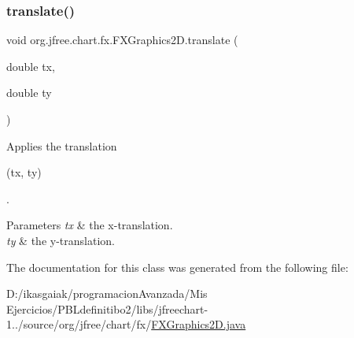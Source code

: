 \subsubsection{\texorpdfstring{translate()}{translate()}\hspace{0.1cm}{\footnotesize\ttfamily [2/2]}}
{\footnotesize\ttfamily void org.\+jfree.\+chart.\+fx.\+F\+X\+Graphics2\+D.\+translate (\begin{DoxyParamCaption}\item[{double}]{tx,  }\item[{double}]{ty }\end{DoxyParamCaption})}

Applies the translation
\begin{DoxyCode}
(tx, ty) 
\end{DoxyCode}
 .


\begin{DoxyParams}{Parameters}
{\em tx} & the x-\/translation. \\
\hline
{\em ty} & the y-\/translation. \\
\hline
\end{DoxyParams}


The documentation for this class was generated from the following file\+:\begin{DoxyCompactItemize}
\item 
D\+:/ikasgaiak/programacion\+Avanzada/\+Mis Ejercicios/\+P\+B\+Ldefinitibo2/libs/jfreechart-\/1../source/org/jfree/chart/fx/\mbox{\hyperlink{_f_x_graphics2_d_8java}{F\+X\+Graphics2\+D.\+java}}\end{DoxyCompactItemize}
